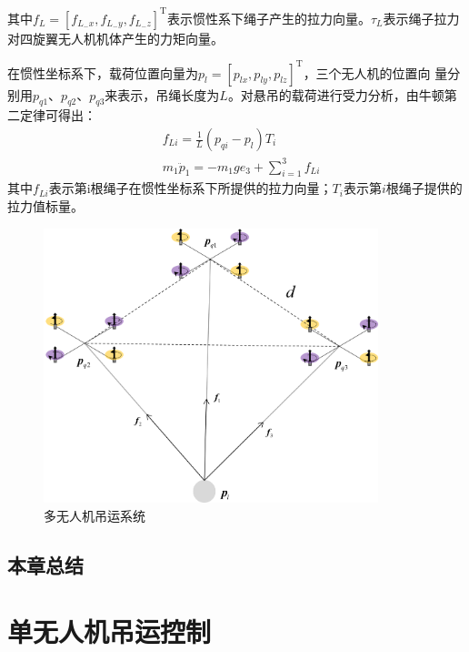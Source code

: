 \documentclass[lang=chs, degree=master, blindreview=false, winfonts=true]{yanputhesis}
\begin{document}
其中$f_{L}=[f_{L_{-}x},f_{L_{-}y},f_{L_{-}z}]^{\mathrm{T}}$表示惯性系下绳子产生的拉力向量。$\tau_{L}$表示绳子拉力对四旋翼无人机机体产生的力矩向量。

在惯性坐标系下，载荷位置向量为$p_{l}=[p_{lx},p_{ly},p_{lz}]^{\mathrm{T}}$，三个无人机的位置向
量分别用$p_{q1}$、$p_{q2}$、$p_{q3}$来表示，吊绳长度为$L$。对悬吊的载荷进行受力分析，由牛顿第二定律可得出：
\begin{equation}
	\begin{aligned}
		&f_{Li}=\frac{1}{L}(p_{qi}-p_{l})T_{i} \\
		&m_{1}\ddot{p}_{1}=-m_{1}ge_{3}+\sum_{i=1}^{3}f_{Li}
	\end{aligned}
\end{equation}
其中$f_{Li}$表示第i根绳子在惯性坐标系下所提供的拉力向量；$T_{i}$表示第$i$根绳子提供的拉力值标量。

\begin{figure}[hbt!]
	\centering
	\includegraphics[width=23pc]{picture/2_3.png} 
	\caption{多无人机吊运系统} \label{2_3}
\end{figure}

\section{本章总结}

\cleardoublepage

\chapter{单无人机吊运控制}
\end{document}
